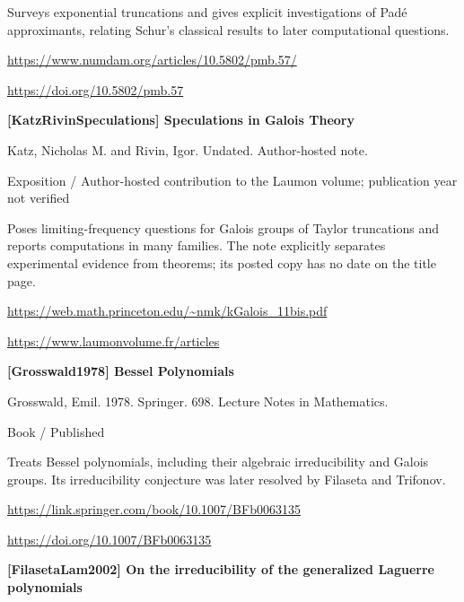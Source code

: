 \documentclass[11pt,a4paper,oneside,openany]{book}
\begin{document}
\color{black} Surveys exponential truncations and gives explicit investigations of Padé approximants, relating Schur's classical results to later computational questions.\par
{\footnotesize\url{https://www.numdam.org/articles/10.5802/pmb.57/}}\par
{\footnotesize\url{https://doi.org/10.5802/pmb.57}}\par
\vspace{9pt}
\hypertarget{ref:KatzRivinSpeculations}{}
{\sffamily\bfseries\color{atlasgreen}[KatzRivinSpeculations] Speculations in Galois Theory}\par
\color{black} Katz, Nicholas M. and Rivin, Igor. Undated. Author-hosted note.\par
{\small\sffamily\color{atlasgold}Exposition / Author-hosted contribution to the Laumon volume; publication year not verified}\par
\color{black} Poses limiting-frequency questions for Galois groups of Taylor truncations and reports computations in many families. The note explicitly separates experimental evidence from theorems; its posted copy has no date on the title page.\par
{\footnotesize\url{https://web.math.princeton.edu/~nmk/kGalois_11bis.pdf}}\par
{\footnotesize\url{https://www.laumonvolume.fr/articles}}\par
\vspace{9pt}
\hypertarget{ref:Grosswald1978}{}
{\sffamily\bfseries\color{atlasgreen}[Grosswald1978] Bessel Polynomials}\par
\color{black} Grosswald, Emil. 1978. Springer. 698. Lecture Notes in Mathematics.\par
{\small\sffamily\color{atlasgold}Book / Published}\par
\color{black} Treats Bessel polynomials, including their algebraic irreducibility and Galois groups. Its irreducibility conjecture was later resolved by Filaseta and Trifonov.\par
{\footnotesize\url{https://link.springer.com/book/10.1007/BFb0063135}}\par
{\footnotesize\url{https://doi.org/10.1007/BFb0063135}}\par
\vspace{9pt}
\hypertarget{ref:FilasetaLam2002}{}
{\sffamily\bfseries\color{atlasgreen}[FilasetaLam2002] On the irreducibility of the generalized Laguerre polynomials}\par
\end{document}
